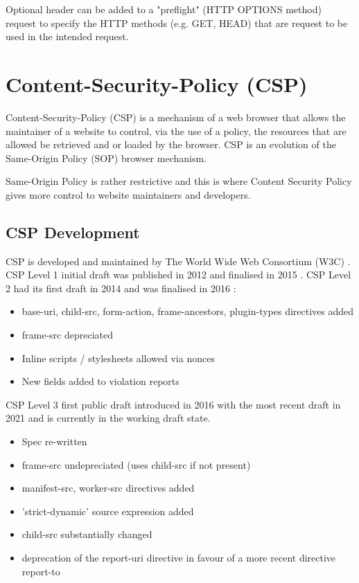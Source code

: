 \documentclass{mscreport}
\begin{document}
Optional header can be added to a "preflight" (HTTP OPTIONS method) request to specify the HTTP methods (e.g. GET, HEAD) that are request to be used in the intended request.

\newpage

\section{Content-Security-Policy (CSP)}

Content-Security-Policy (CSP) is a mechanism of a web browser that allows the maintainer of a website to control, via the use of a policy, the resources that are allowed be retrieved and or loaded by the browser. CSP is an evolution of the Same-Origin Policy (SOP) browser mechanism.

\vspace{0.3cm}
\noindent
Same-Origin Policy is rather restrictive and this is where Content Security Policy gives more control to website maintainers and developers.

\subsection{CSP Development}

CSP is developed and maintained by The World Wide Web Consortium (W3C) \cite{Barth2012-ow}.
CSP Level 1 initial draft was published in 2012 \cite{Barth2012-ow} and finalised in 2015 \cite{Barth2015-ez}.
CSP Level 2 had its first draft in 2014 \cite{West2014-oe} and was finalised in 2016 \cite{West2016-ol}:
\begin{itemize}
	\setlength\itemsep{0.1em}
	\item base-uri, child-src, form-action, frame-ancestors, plugin-types directives added
	\item frame-src depreciated
	\item Inline scripts / stylesheets allowed via nonces
	\item New fields added to violation reports
\end{itemize}

CSP Level 3 first public draft introduced in 2016 \cite{West2016-xj} with the most recent draft in 2021 \cite{West2021-hi} and is currently in the working draft state.
\begin{itemize}
	\setlength\itemsep{0.1em}
	\item Spec re-written
	\item frame-src undepreciated (uses child-src if not present)
	\item manifest-src, worker-src directives added
	\item 'strict-dynamic' source expression added
	\item child-src substantially changed
	\item deprecation of the report-uri directive in favour of a more recent directive report-to
\end{itemize}
\end{document}
